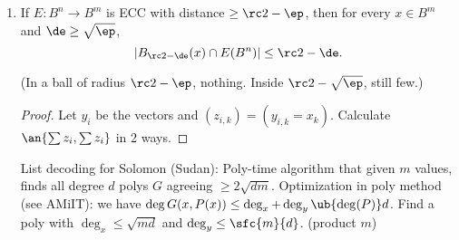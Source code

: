 \begin{enumerate}
Walsh-Hadamard ($\rh<\rc4$): $f(x\opl e_j)+f(x)$. 

Reed-Muller: local decoder handling $\rh=\rc 6(1-\fc d{|\F|})$ errors. Construction: Query on all points of a random line through $x$. By Markov, with probability $\fc23$, at most $3\rh <\rc 2(1-\fc d{|\F|})$ points on the line are bad, so can use Reed-Solomon decoder.

Concatenation: Requires $O(q_1q_2\lg q_1\lg |\Si|)$ queries. Proof: Repeat decoding for $E_2$ $\log q_1$ times in order to get with probability $1-\fc{\ep}{q_1}$, so that $q_1$ blocks of it has a constant chance of mistake.

\begin{thm}
$[f\in EXP, \forall n, H^1(f)(n)\ge S(n)]\implies [\exists g\in EXP,H_{\avg}^.99(g)(n)\ge \rc{n^c}S\pf nc, n\gg 1$.
\end{thm}
\begin{proof}
Concatenating WH and RM (with appropriate parameters) gives an ECC $\{0,1\}^N\to \{0,1\}^{N^C}$, computable in poly time, and with a local decoding algorithm using polylog($N$) time handling 0.01 fraction of errors. (Details: $|\F|\approx \lg^5 N$, $\ell=\fc{\lg N}{\lg\lg N}$, $d=\lg^2 N$, so $\de\le 1-\rc{\lg N}$; WH on $\log |\F|$.

Prove the contrapositive. We can $\fc23$ decoding algorithm into $>1-2^{-n}$ decoding algorithm by repeating polynomialy many times (Chernoff). Then there is some random string that will recover $f$ on every value.

\end{proof}
\begin{cor}
Let $S:\N\to \N$ be monotone and time-constructible. Then $\exists \ep>0, [\exists f\in E, \forall n,H^1(f)(n)\ge S(n)\implies \exists \wh f\in E, H_{\avg}(f)(n)\ge S(\sqrt n)^\ep]$.
\end{cor}
Combine the theorem with Yao XOR to get down from $.99$ to $\rc2+\rc S$.
\item 
\begin{thm}
If $E:B^n\to B^m$ is ECC with distance $\ge \rc2-\ep$, then for every $x\in B^m$ and $\de\ge \sqrt{\ep}$, 
\[
|B_{\rc 2-\de}(x)\cap E(B^n)|\le \rc2-\de.
\]
\end{thm}
(In a ball of radius $\rc2-\ep$, nothing. Inside $\rc2-\sqrt{\ep}$, still few.)
\begin{proof}
Let $y_i$ be the vectors and $(z_{i,k})=(y_{i,k}=x_k)$. Calculate $\an{\sum z_i,\sum z_i}$ in 2 ways.
\end{proof}
List decoding for Solomon (Sudan): Poly-time algorithm that given $m$ values, finds all degree $d$ polys $G$ agreeing $\ge 2\sqrt{dm}$. Optimization in poly method (see AMiIT): we have $\deg G(x,P(x))\le \deg_x+\deg_y\ub{\deg(P)}d$. Find a poly with $\deg_x\le \sqrt{md}$ and $\deg_y\le \sfc{m}{d}$. (product $m$)


\end{enumerate}
